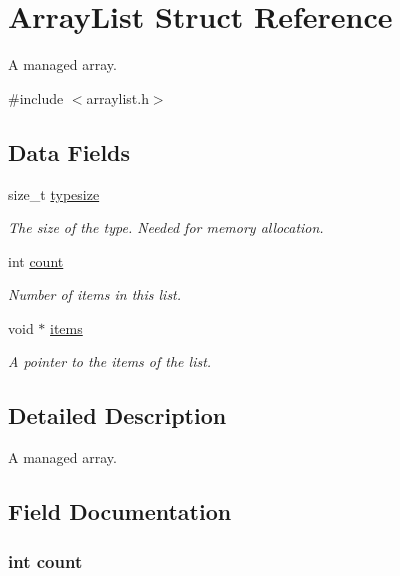 \hypertarget{struct_array_list}{\section{Array\-List Struct Reference}
\label{struct_array_list}
}


A managed array.  




{\ttfamily \#include $<$arraylist.\-h$>$}

\subsection*{Data Fields}
\begin{DoxyCompactItemize}
\item 
size\-\_\-t \hyperlink{struct_array_list_aae15b6d77b58dbd6f21861d1320ec961}{typesize}
\begin{DoxyCompactList}\small\item\em The size of the type. Needed for memory allocation. \end{DoxyCompactList}\item 
int \hyperlink{struct_array_list_ad43c3812e6d13e0518d9f8b8f463ffcf}{count}
\begin{DoxyCompactList}\small\item\em Number of items in this list. \end{DoxyCompactList}\item 
void $\ast$ \hyperlink{struct_array_list_aaf3a7f7e06149edc000a4a62ca99ec18}{items}
\begin{DoxyCompactList}\small\item\em A pointer to the items of the list. \end{DoxyCompactList}\end{DoxyCompactItemize}


\subsection{Detailed Description}
A managed array. 

\subsection{Field Documentation}
\hypertarget{struct_array_list_ad43c3812e6d13e0518d9f8b8f463ffcf}{
\subsubsection[{count}]{\setlength{\rightskip}{0pt plus 5cm}int count}}\label{struct_array_list_ad43c3812e6d13e0518d9f8b8f463ffcf}



